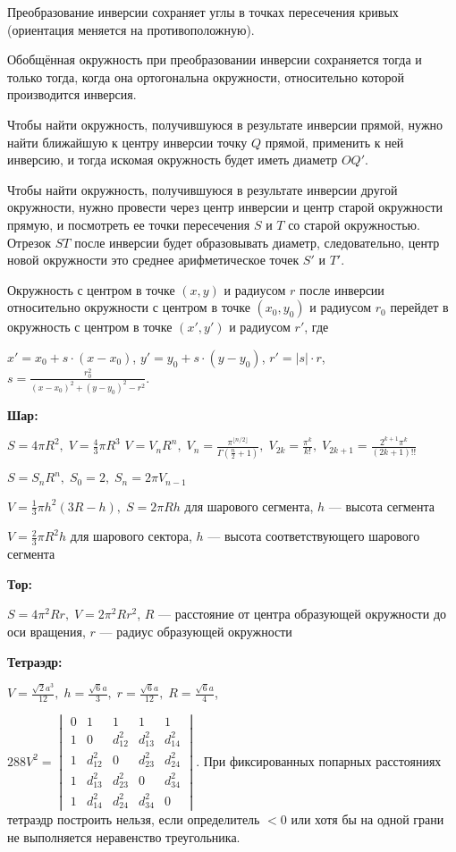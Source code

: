 Преобразование инверсии сохраняет углы в точках пересечения кривых (ориентация меняется на противоположную).

Обобщённая окружность при преобразовании инверсии сохраняется тогда и только тогда, когда она ортогональна окружности, относительно которой производится инверсия.

Чтобы найти окружность, получившуюся в результате инверсии прямой, нужно найти ближайшую к центру инверсии точку $Q$ прямой, применить к ней инверсию, и тогда искомая окружность будет иметь диаметр $OQ'$.

Чтобы найти окружность, получившуюся в результате инверсии другой окружности, нужно провести через центр инверсии и центр старой окружности прямую, и посмотреть ее точки пересечения $S$ и $T$ со старой окружностью. Отрезок $ST$ после инверсии будет образовывать диаметр, следовательно, центр новой окружности это среднее арифметическое точек $S'$ и $T'$.

Окружность с центром в точке $(x, y)$ и радиусом $r$ после инверсии относительно окружности с центром в точке $(x_0, y_0)$ и радиусом $r_0$ перейдет в окружность с центром в точке $(x', y')$ и радиусом $r'$, где

$x' = x_0 + s \cdot (x - x_0)$,
$y' = y_0 + s \cdot (y - y_0)$,
$r' = |s| \cdot r$,
$s = \frac { r_0^2 } { (x - x_0)^2 + (y - y_0)^2 - r^2 }$.

\textbf{Шар:}

$S=4\pi R^{2},\; V=\frac{4}{3}\pi R^{3}$
$V=V_{n}R^{n},\; V_{n}=\frac{\pi ^{\lfloor n/2 \rfloor}}{\Gamma (\frac{n}{2} + 1)},\; V_{2k}=\frac{\pi^{k}}{k!},\; V_{2k+1}=\frac{2^{k+1}\pi^{k}}{(2k+1)!!}$

$S=S_{n}R^{n},\; S_{0}=2,\; S_{n}=2\pi V_{n - 1}$

$V=\frac{1}{3}\pi h^{2}(3R-h),\; S=2\pi Rh$ для шарового сегмента, $h$ --- высота сегмента

$V=\frac{2}{3}\pi R^{2}h$ для шарового сектора, $h$ --- высота соответствующего шарового сегмента

\textbf{Тор:}

$S=4\pi^2Rr,\; V=2\pi^2Rr^2$, $R$ --- расстояние от центра образующей окружности до оси вращения, $r$ --- радиус образующей окружности

\textbf{Тетраэдр:}

$V=\frac{\sqrt 2 a^3}{12},\; h=\frac{\sqrt 6 a}{3},\; r=\frac{\sqrt 6 a}{12},\; R=\frac{\sqrt 6 a}{4}$,

$288V^2=
\begin{vmatrix}
0 & 1 & 1 & 1 & 1\\ 
1 & 0 & d_{12}^{2} & d_{13}^{2} & d_{14}^{2}\\ 
1 & d_{12}^{2} & 0 & d_{23}^{2} & d_{24}^{2}\\ 
1 & d_{13}^{2} & d_{23}^{2} & 0 & d_{34}^{2}\\ 
1 & d_{14}^{2} & d_{24}^{2} & d_{34}^{2} & 0
\end{vmatrix}$. При фиксированных попарных расстояниях тетраэдр построить нельзя, если определитель $<0$ или хотя бы на одной грани не выполняется неравенство треугольника.


